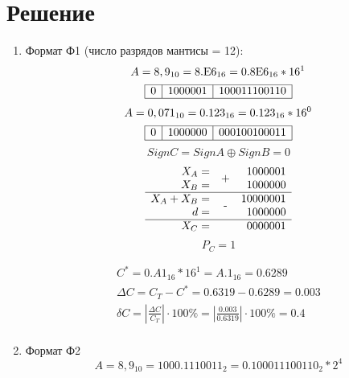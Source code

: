 \documentclass{article}
\begin{document}
\section{Решение}
\begin{enumerate}
       \item Формат Ф1 (число разрядов мантисы = 12):
             $$ A = 8,9_{10} = \textmd{8.E6}_{16} = \textmd{0.8E6}_{16} * 16^1 $$
             $$
                    \begin{array}{|c|c|c|}
                           \hline        
                           0 & 1000001 & 100011100110 \\\hline
                    \end{array}
             $$
             $$ A = 0,071_{10} = \textmd{0.123}_{16} = \textmd{0.123}_{16} * 16^0 $$
             $$
                    \begin{array}{|c|c|c|}
                           \hline        
                           0 & 1000000 & 000100100011 \\\hline
                    \end{array}
             $$
             $$ SignC = SignA \oplus SignB = 0 $$
             $$
                    \begin{array}{rcr}
                           X_A         = & \PLUS  & 1000001         \\
                           X_B         = &        & 1000000 \nl
                           X_A + X_B   = & \MINUS & 10000001        \\
                           d           = &        & 1000000     \nl
                           X_C         = &        & 0000001
                    \end{array}
             $$
             $$ P_C = 1 $$
             
             $$
                    \begin{array}{c}
                           C^* = 0.A1_{16} * 16^1 = A.1_{16}  = 0.6289\\
                           \Delta C = C_T - C^* = 0.6319 - 0.6289 = 0.003 \\
                           \delta C = \left|\frac{\Delta C}{C_T}\right| \cdot 100\% = \left|\frac{0.003}{0.6319}\right| \cdot 100\% = 0.4 \\
                    \end{array}
             $$
       \item Формат Ф2
              $$ A = 8,9_{10} = 1000.1110011_{2} = 0.100011100110_{2} * 2^4 $$
              $$
                     \begin{array}{|c|c|c|}

\end{array}$$
\end{enumerate}
\end{document}
